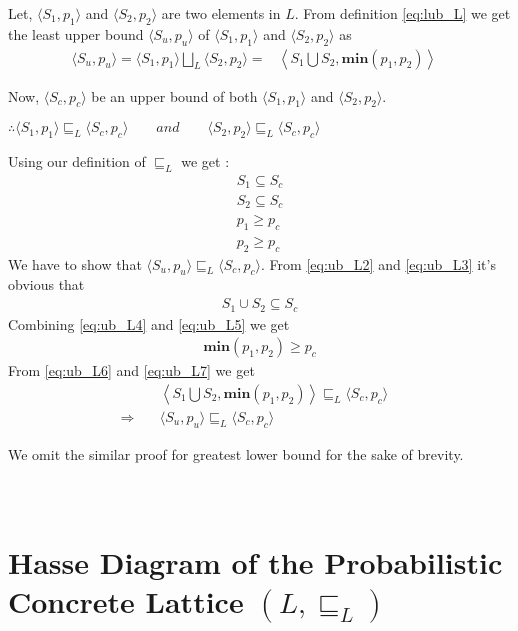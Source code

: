 \documentclass[final,3p, review, times]{util/elsarticle}
\begin{document}
Let, $\langle S_1,p_1\rangle$ and $\langle S_2,p_2\rangle$ are two elements in $L$. From definition \ref{eq:lub_L} we get the least upper bound $\langle S_u,p_u\rangle$ of $\langle S_1,p_1\rangle$ and $\langle S_2,p_2\rangle$ as
\begin{align}
\langle S_u,p_u\rangle=\langle S_1,p_1\rangle\bigsqcup_L\langle S_2,p_2\rangle=&\left\langle S_1\bigcup S_2,\textbf{min}(p_1,p_2)\right\rangle\label{eq:ub_L1}&
\end{align}

Now, $\langle S_c,p_c\rangle$ be an upper bound of both $\langle S_1,p_1\rangle$ and $\langle S_2,p_2\rangle$.

$\therefore \langle S_1,p_1\rangle\sqsubseteq_L\langle S_c,p_c\rangle\qquad and\qquad \langle S_2,p_2\rangle\sqsubseteq_L \langle S_c,p_c\rangle$

Using our definition of $\sqsubseteq_L$ we get :
\begin{align}
&S_1\subseteq S_c&\label{eq:ub_L2}\\
&S_2\subseteq S_c&\label{eq:ub_L3}\\
&p_1\geq p_c&\label{eq:ub_L4}\\
&p_2\geq p_c&\label{eq:ub_L5}
\end{align}
We have to show that $\langle S_u,p_u\rangle\sqsubseteq_L \langle S_c,p_c\rangle$. From \ref{eq:ub_L2} and \ref{eq:ub_L3} it's obvious that
\begin{align}
&S_1\cup S_2\subseteq S_c&\label{eq:ub_L6}
\end{align}
Combining \ref{eq:ub_L4} and \ref{eq:ub_L5} we get
\begin{align}
&\textbf{min}(p_1,p_2)\geq p_c&\label{eq:ub_L7}
\end{align}
From \ref{eq:ub_L6} and \ref{eq:ub_L7} we get
\begin{align}
&\left\langle S_1\bigcup S_2, \textbf{min}(p_1,p_2)\right\rangle\sqsubseteq_L\langle S_c,p_c\rangle&\nonumber\\
\Rightarrow\quad&\langle S_u,p_u\rangle\sqsubseteq_L\langle S_c,p_c\rangle\nonumber
\end{align}

We omit the similar proof for greatest lower bound for the sake of brevity.










\newpage
\section{\\Hasse Diagram of the Probabilistic Concrete Lattice $(L,\sqsubseteq_L)$}
\label{app:concrete_hasse}
\end{document}
